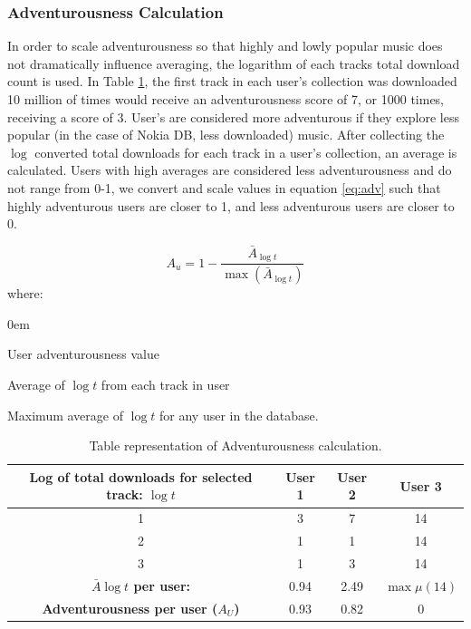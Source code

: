 \documentclass[a4paper]{article}
\begin{document}
\subsubsection{Adventurousness Calculation} \label{app:adv}
In order to scale adventurousness so that highly and lowly popular music does not dramatically influence averaging, the logarithm of each tracks total download count is used. In Table \ref{tab:adv}, the first track in each user's collection was downloaded 10 million of times would receive an adventurousness score of 7, or 1000 times, receiving a score of 3. User's are considered more adventurous if they explore less popular (in the case of Nokia DB, less downloaded) music. After collecting the $\log$ converted total downloads for each track in a user's collection, an average is calculated. Users with high averages are considered less adventurousness and do not range from 0-1, we convert and scale values in equation \ref{eq:adv} such that highly adventurous users are closer to 1, and less adventurous users are closer to 0.

\begin{equation}
A_u =  1-\frac{\bar{A}_{\log t}}{\max(\bar{A}_{\log t})}
\label{eq:adv}
\end{equation} 
where:
\begin{description}\itemsep0em
\item[$A_u$:] User adventurousness value
\item[\indent$\bar{A}_{\log t}$:] Average of $\log t$ from each track in user
\item[$\max(\bar{A}_{\log t})$:] Maximum average of $\log t$ for any user in the database.
\end{description}

\begin{table}[h!]
\centering
\begin{tabular}{|c|c|c|c|}
\hline
Log of total downloads for selected track: $\log t$  & User 1 & User 2 & User 3 \\
\hline
1 & 3 & 7 & 14 \\
2 & 1 & 1 & 14 \\
3 & 1 & 3 & 14 \\
\hline
\hline
\textbf{$\bar{A} \log t$ per user:} & 0.94 & 2.49 & \textbf{$\max \mu (14)$} \\
\textbf{Adventurousness per user ($A_U$)} & 0.93 & 0.82 & 0 \\
\hline
\end{tabular}
\caption[Adventurousness Calculation Example]{Table representation of Adventurousness calculation.}
\label{tab:adv}
\end{table}
\end{document}
